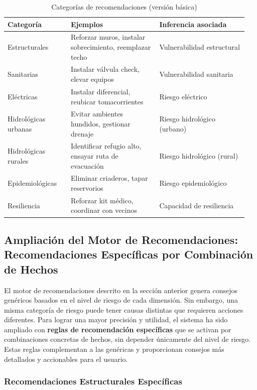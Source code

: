 \documentclass[12pt, letterpaper]{article}
\begin{document}
\begin{table}[H]
\centering
\caption{Categorías de recomendaciones (versión básica)}
\label{tab:rec_categorias}
\begin{tabular}{@{}p{0.25\linewidth}p{0.35\linewidth}p{0.35\linewidth}@{}}
\toprule
\textbf{Categoría} & \textbf{Ejemplos} & \textbf{Inferencia asociada} \\ \midrule
Estructurales & Reforzar muros, instalar sobrecimiento, reemplazar techo & Vulnerabilidad estructural \\
Sanitarias & Instalar válvula check, elevar equipos & Vulnerabilidad sanitaria \\
Eléctricas & Instalar diferencial, reubicar tomacorrientes & Riesgo eléctrico \\
Hidrológicas urbanas & Evitar ambientes hundidos, gestionar drenaje & Riesgo hidrológico (urbano) \\
Hidrológicas rurales & Identificar refugio alto, ensayar ruta de evacuación & Riesgo hidrológico (rural) \\
Epidemiológicas & Eliminar criaderos, tapar reservorios & Riesgo epidemiológico \\
Resiliencia & Reforzar kit médico, coordinar con vecinos & Capacidad de resiliencia \\ \bottomrule
\end{tabular}
\end{table}

\subsection{Ampliación del Motor de Recomendaciones: Recomendaciones Específicas por Combinación de Hechos}

El motor de recomendaciones descrito en la sección anterior genera consejos genéricos basados en el nivel de riesgo de cada dimensión. Sin embargo, una misma categoría de riesgo puede tener causas distintas que requieren acciones diferentes. Para lograr una mayor precisión y utilidad, el sistema ha sido ampliado con \textbf{reglas de recomendación específicas} que se activan por combinaciones concretas de hechos, sin depender únicamente del nivel de riesgo. Estas reglas complementan a las genéricas y proporcionan consejos más detallados y accionables para el usuario.

\subsubsection*{Recomendaciones Estructurales Específicas}
\end{document}
